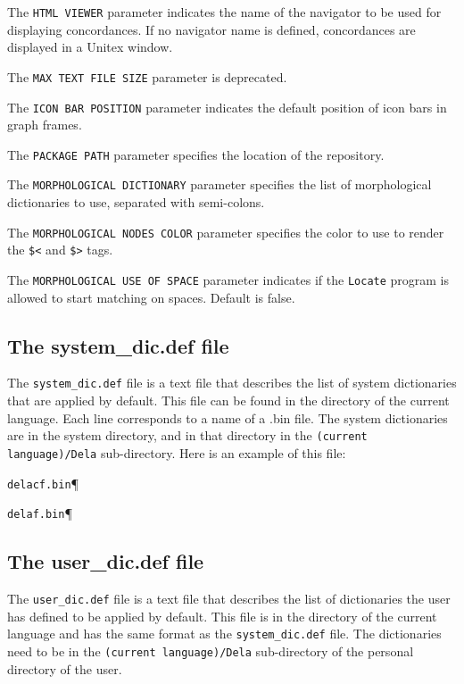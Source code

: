 \bigskip
\noindent The \verb+HTML VIEWER+ parameter indicates the name of the navigator to
be used for displaying concordances. If no navigator name is defined,
concordances are displayed in a Unitex window.

\bigskip
\noindent The \verb+MAX TEXT FILE SIZE+ parameter is deprecated.

\bigskip
\noindent The \verb+ICON BAR POSITION+ parameter indicates the default position of
icon bars in graph frames.

\bigskip
\noindent The \verb+PACKAGE PATH+ parameter specifies the location of the
repository.

\bigskip
\noindent The \verb+MORPHOLOGICAL DICTIONARY+ parameter specifies the list of
morphological dictionaries to use, separated with semi-colons.

\bigskip
\noindent The \verb+MORPHOLOGICAL NODES COLOR+ parameter specifies the color
to use to render the \verb+$<+ and \verb+$>+ tags. 

\bigskip
\noindent The \verb+MORPHOLOGICAL USE OF SPACE+ parameter indicates if the
\verb+Locate+ program is allowed to start matching on spaces. Default is false. 


\subsection{The system\_dic.def file}
The \verb+system_dic.def+ file is a text file that describes the list of system
dictionaries that are applied by default. This file can be found in the directory
of the current language. Each line corresponds to a name of a .bin file. The
system dictionaries are in the system directory, and in that directory in the
\verb+(current language)/Dela+ sub-directory.  Here is an
example of this file:


\bigskip
\verb$delacf.bin$\P

\verb$delaf.bin$\P

\subsection{The user\_dic.def file}
The \verb+user_dic.def+ file is a text file that describes the list of
dictionaries the user has defined to be applied by default. This file is in the
directory of the current language and has the same format as the
\verb+system_dic.def+ file. 
The dictionaries need to be in the \verb+(current language)/Dela+ sub-directory of the personal directory of the user.

